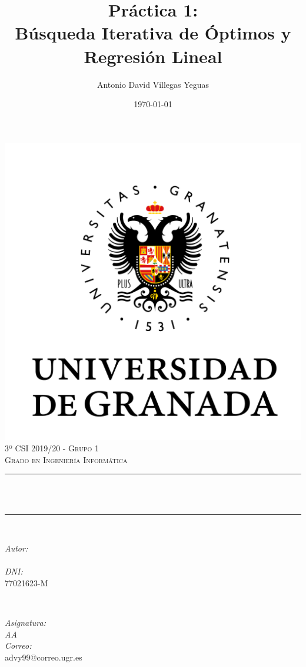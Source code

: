 \documentclass[12pt, spanish]{article}
\title{Práctica 1:\\
Búsqueda Iterativa de Óptimos y Regresión Lineal  \hspace{0.05cm} }
\author{Antonio David Villegas Yeguas}
\date{\today}
\makeatletter
\let\thetitle\@title
\let\theauthor\@author
\makeatother
\begin{document}

\begin{titlepage}
    \centering
    \vspace*{0.3 cm}
    \includegraphics[scale = 0.50]{ugr.png}\\[0.7 cm]
    \textsc{\large 3º CSI 2019/20 - Grupo 1}\\[0.5 cm]            
    \textsc{\large Grado en Ingeniería Informática}\\[0.5 cm]              
    \rule{\linewidth}{0.2 mm} \\[0.2 cm]
    { \huge \bfseries \thetitle}\\
    \rule{\linewidth}{0.2 mm} \\[1 cm]
    
    \begin{minipage}{0.4\textwidth}
        \begin{flushleft} \large
            \emph{Autor:}\\
            \theauthor\\ 
			 \emph{DNI:}\\
            77021623-M
            \end{flushleft}
            \end{minipage}~
            \begin{minipage}{0.4\textwidth}
            \begin{flushright} \large
            \emph{Asignatura: \\
            AA}   \\     
            \emph{Correo:}\\
            advy99@correo.ugr.es           
        \end{flushright}
    \end{minipage}\\[0.5cm]
  

\end{titlepage}
\end{document}
